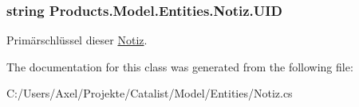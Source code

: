 \subsubsection[{\texorpdfstring{U\+ID}{UID}}]{\setlength{\rightskip}{0pt plus 5cm}string Products.\+Model.\+Entities.\+Notiz.\+U\+ID\hspace{0.3cm}{\ttfamily [get]}}\hypertarget{class_products_1_1_model_1_1_entities_1_1_notiz_a41e2e6af043d8ecdb6b64c02800630e5}{}\label{class_products_1_1_model_1_1_entities_1_1_notiz_a41e2e6af043d8ecdb6b64c02800630e5}


Primärschlüssel dieser \hyperlink{class_products_1_1_model_1_1_entities_1_1_notiz}{Notiz}. 



The documentation for this class was generated from the following file\+:\begin{DoxyCompactItemize}
\item 
C\+:/\+Users/\+Axel/\+Projekte/\+Catalist/\+Model/\+Entities/Notiz.\+cs\end{DoxyCompactItemize}

